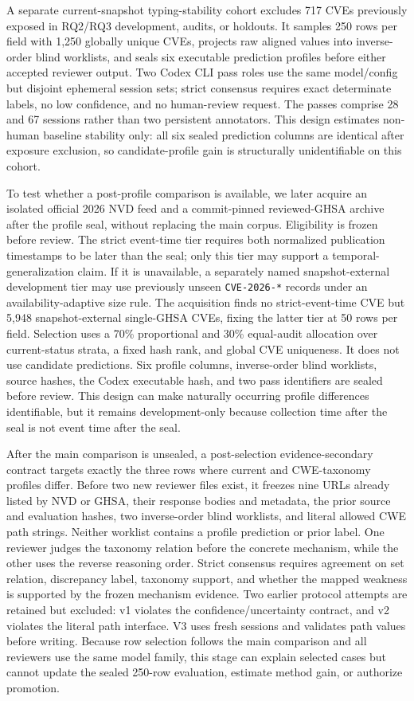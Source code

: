 A separate current-snapshot typing-stability cohort excludes 717 CVEs previously exposed in RQ2/RQ3 development, audits, or holdouts. It samples 250 rows per field with 1,250 globally unique CVEs, projects raw aligned values into inverse-order blind worklists, and seals six executable prediction profiles before either accepted reviewer output. Two Codex CLI pass roles use the same model/config but disjoint ephemeral session sets; strict consensus requires exact determinate labels, no low confidence, and no human-review request. The passes comprise 28 and 67 sessions rather than two persistent annotators. This design estimates non-human baseline stability only: all six sealed prediction columns are identical after exposure exclusion, so candidate-profile gain is structurally unidentifiable on this cohort.

To test whether a post-profile comparison is available, we later acquire an isolated official 2026 NVD feed and a commit-pinned reviewed-GHSA archive after the profile seal, without replacing the main corpus. Eligibility is frozen before review. The strict event-time tier requires both normalized publication timestamps to be later than the seal; only this tier may support a temporal-generalization claim. If it is unavailable, a separately named snapshot-external development tier may use previously unseen \texttt{CVE-2026-*} records under an availability-adaptive size rule. The acquisition finds no strict-event-time CVE but 5,948 snapshot-external single-GHSA CVEs, fixing the latter tier at 50 rows per field. Selection uses a 70\% proportional and 30\% equal-audit allocation over current-status strata, a fixed hash rank, and global CVE uniqueness. It does not use candidate predictions. Six profile columns, inverse-order blind worklists, source hashes, the Codex executable hash, and two pass identifiers are sealed before review. This design can make naturally occurring profile differences identifiable, but it remains development-only because collection time after the seal is not event time after the seal.

After the main comparison is unsealed, a post-selection evidence-secondary contract targets exactly the three rows where current and CWE-taxonomy profiles differ. Before two new reviewer files exist, it freezes nine URLs already listed by NVD or GHSA, their response bodies and metadata, the prior source and evaluation hashes, two inverse-order blind worklists, and literal allowed CWE path strings. Neither worklist contains a profile prediction or prior label. One reviewer judges the taxonomy relation before the concrete mechanism, while the other uses the reverse reasoning order. Strict consensus requires agreement on set relation, discrepancy label, taxonomy support, and whether the mapped weakness is supported by the frozen mechanism evidence. Two earlier protocol attempts are retained but excluded: v1 violates the confidence/uncertainty contract, and v2 violates the literal path interface. V3 uses fresh sessions and validates path values before writing. Because row selection follows the main comparison and all reviewers use the same model family, this stage can explain selected cases but cannot update the sealed 250-row evaluation, estimate method gain, or authorize promotion.

